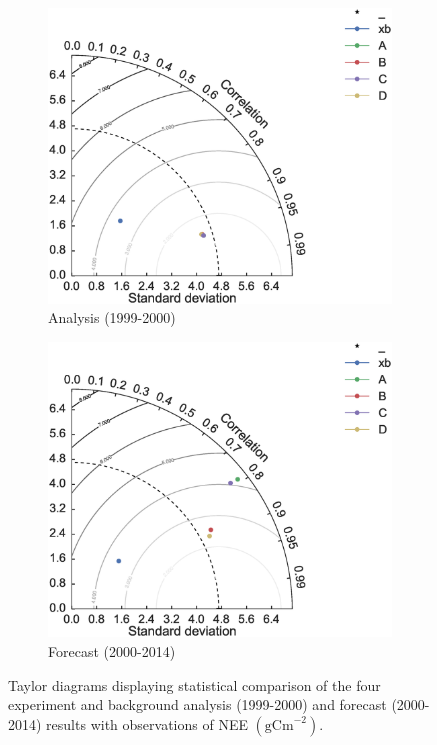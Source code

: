 \documentclass[11pt]{article}
\begin{document}
\begin{figure}[ht]
    \centering
    \begin{subfigure}[b]{0.49\textwidth}
        \includegraphics[width=\textwidth]{tdcvt_a.eps}
        \caption{Analysis (1999-2000)}
        \label{fig:td_a}
    \end{subfigure}
    \begin{subfigure}[b]{0.49\textwidth}
        \includegraphics[width=\textwidth]{tdcvt_f.eps}
        \caption{Forecast (2000-2014)}
        \label{fig:td_f}
    \end{subfigure}
    \caption{Taylor diagrams displaying statistical comparison of the four experiment and background analysis (1999-2000) and forecast (2000-2014) results with observations of NEE $( \text{gCm}^{-2})$.}
    \label{fig:taylordiag}
\end{figure}
\end{document}
